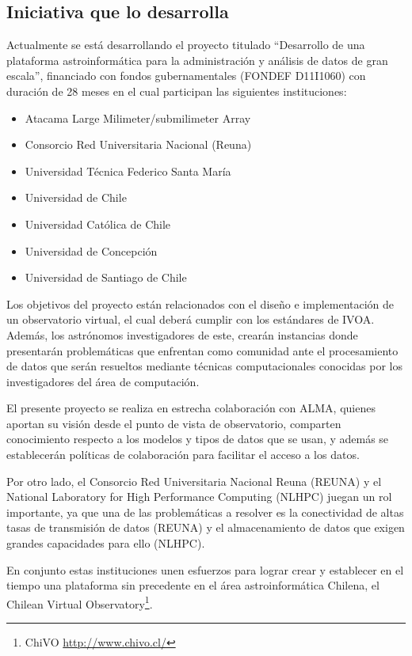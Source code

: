 \subsection{Iniciativa que lo desarrolla}
Actualmente se está desarrollando el proyecto titulado ``Desarrollo de una
plataforma astroinformática para la administración y análisis de datos de gran
escala'', financiado con fondos gubernamentales (FONDEF D11I1060) con duración
de 28 meses en el cual participan las siguientes instituciones:
\begin{itemize}
	\item Atacama Large Milimeter/submilimeter Array
	\item Consorcio Red Universitaria Nacional (Reuna)
	\item Universidad Técnica Federico Santa María
	\item Universidad de Chile
	\item Universidad Católica de Chile
	\item Universidad de Concepción
	\item Universidad de Santiago de Chile
\end{itemize}

Los objetivos del proyecto están relacionados con el diseño e implementación de
un observatorio virtual, el cual deberá cumplir con los estándares de IVOA.
Además, los astrónomos investigadores de este, crearán instancias donde
presentarán problemáticas que enfrentan como comunidad ante el procesamiento de
datos que serán resueltos mediante técnicas computacionales conocidas por los
investigadores del área de computación.

El presente proyecto se realiza en estrecha colaboración con ALMA, quienes
aportan su visión desde el punto de vista de observatorio, comparten
conocimiento respecto a los modelos y tipos de datos que se usan, y además se
establecerán políticas de colaboración para facilitar el acceso a los datos.

Por otro lado, el Consorcio Red Universitaria Nacional Reuna (REUNA) y el
National Laboratory for High Performance Computing (NLHPC) juegan un rol
importante, ya que una de las problemáticas a resolver es la conectividad de
altas tasas de transmisión de datos (REUNA) y el almacenamiento de datos que
exigen grandes capacidades para ello (NLHPC).

En conjunto estas instituciones unen esfuerzos para lograr crear y establecer
en el tiempo una plataforma sin precedente en el área astroinformática Chilena,
el Chilean Virtual Observatory\footnote{ChiVO \url{http://www.chivo.cl/}}.
